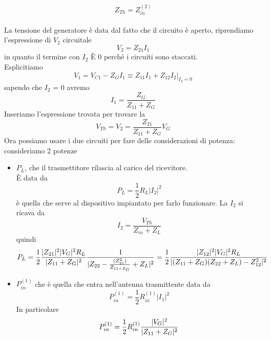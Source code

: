 \documentclass[oneside, 12pt]{extbook}
\DeclarePairedDelimiter{\abs}{\lvert}{\rvert}
\begin{document}
\begin{equation}
	Z_{Th} = Z_{in}^{(2)}	
\end{equation}
\\La tensione del generatore è data dal fatto che il circuito è aperto, riprendiamo l'espressione di $V_2$ circuitale 
\begin{equation}
	V_2 = Z_{21}I_1	
\end{equation}
in quanto il termine con $I_2$ È 0 perché i circuiti sono staccati.\\Esplicitiamo
\begin{equation}
	V_1 = V_{C1} - Z_G I_1 \equiv Z_{11}I_1 + Z_{12}I_2\bigg\rvert_{I_2 = 0}
\end{equation}
sapendo che $I_2$ = 0 avremo 
\begin{equation}
	I_1 = \dfrac{Z_G}{Z_{11} + Z_G}	
\end{equation}
Inseriamo l'espressione trovata per trovare la 
\begin{equation}
	V_{Th} = V_2 = \dfrac{Z_{21}}{Z_{11} + Z_G} V_G	
\end{equation}
Ora possiamo usare i due circuiti per fare delle considerazioni di potenza: consideriamo 2 potenze
\begin{itemize}
	\item $P_L$, che il trasmettitore rilascia al carico del ricevitore.\\È data da 
	\begin{equation}
		P_L = \frac{1}{2} R_{L}|I_2|^2	
	\end{equation}
	è quella che serve al dispositivo impiantato per farlo funzionare. La $I_2$ si ricava da
	\begin{equation}
	I_2 = \dfrac{V_{Th}}{Z_{in} + Z_L}	
	\end{equation}
	quindi
	\begin{equation}
		P_L = 
		\frac{1}{2} \dfrac{\abs{Z_{21}}^2 \abs{V_G}^2 R_L}{\abs{Z_{11} + Z_G}^2} \dfrac{1}{\abs{Z_{22} - \frac{(Z_{21}^2)}{Z_{11 + Z_G}} + Z_L}^2}
		= \frac{1}{2} \dfrac{\abs{Z_{12}}^2 \abs{V_G}^2 R_L}{\abs{(Z_{11} + Z_G)(Z_{22}+Z_L) - Z_{12}^2}^2}
	\end{equation}
	\item $P_{in}^{(1)}$ che è quella che entra nell'antenna trasmittente data da 
	\begin{equation}
		P_{in}^{(1)} = \frac{1}{2}R_{in}^{(1)} |I_1|^2 
	\end{equation}
	In particolare 
	\begin{equation}
		P_{in}^{(1)} = \frac{1}{2}R_{in}^{(1)} \dfrac{\abs{V_G}^2}{\abs{Z_{11} + Z_G}^2}
	\end{equation}
\end{itemize}
\end{document}
